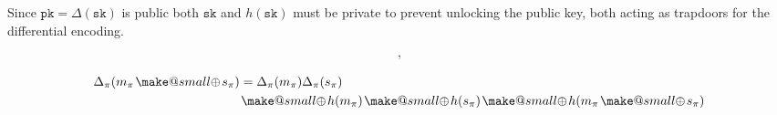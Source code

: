 \documentclass[twocolumn, aps, amsmath, amssymb, nofootinbib, superscriptaddress, longbibliography, doublefloatfix, table-of-contents, eqsecnum, rmp]{revtex4-2}
\makeatletter
\newcommand{\soplus}{{{\hspace{1pt}}{\mathbin{\mathpalette\make@small{\mathbin\oplus}}}}{\hspace{1pt}}}
\newcommand{\make@small}[2]{%
  \vcenter{\hbox{%
    \scalebox{0.6}{$\m@th#1#2$}%
  }}%
}
\makeatother
\begin{document}
Since $\mathtt{pk} = \Delta(\mathtt{sk})$ is public both $\mathtt{sk}$ and $h(\mathtt{sk})$ must be private to prevent unlocking the public key, both acting as trapdoors for the differential encoding.



\begin{align}
	[m_\pi \soplus s_\pi, \Delta_\pi(m_\pi\soplus s_\pi)],
\end{align}

\begin{align}
	\Delta_\pi(m_\pi\soplus s_\pi) &= \Delta_\pi(m_\pi) \Delta_\pi(s_\pi) \nonumber\\
	&\soplus h(m_\pi) \soplus h(s_\pi) \soplus h(m_\pi \soplus s_\pi)
\end{align}

\end{document}
